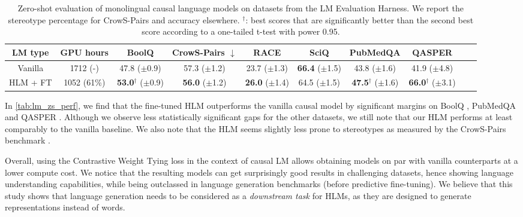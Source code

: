\begin{table}
\centering \scriptsize
\begin{tabular}{cc|cccccccc}
\toprule
LM type       &GPU hours      & BoolQ          & CrowS-Pairs $\downarrow$   & RACE           & SciQ          & PubMedQA &  QASPER    \\ \midrule
Vanilla       &1712 \tiny{(-)} & 47.8 \tiny{($\pm$0.9)}          & 57.3 \tiny{($\pm$1.2)}         & 23.7 \tiny{($\pm$1.3)}           & \textbf{66.4} \tiny{($\pm$1.5)}  & 43.8 \tiny{($\pm$1.6)} &  41.9 \tiny{($\pm$4.8)}        \\ 
HLM \tiny{+ FT} & 1052 \tiny{(61\%)}         & \textbf{53.0}$^\dagger$ \tiny{($\pm$0.9)}           & \textbf{56.0} \tiny{($\pm$1.2)}         & \textbf{26.0} \tiny{($\pm$1.4)}  & 64.5 \tiny{($\pm$1.5)}          & \textbf{47.5}$^\dagger$ \tiny{($\pm$1.6)}  & \textbf{66.0}$^\dagger$ \tiny{($\pm$3.1)}      \\ \bottomrule
\end{tabular}
\caption{Zero-shot evaluation of monolingual causal language models on datasets from the LM Evaluation Harness. We report the stereotype percentage for CrowS-Pairs and accuracy elsewhere. $^\dagger$: best scores that are significantly better than the second best score according to a one-tailed t-test with power 0.95.}
\label{tab:lm_zs_perf}
\end{table}

In \autoref{tab:lm_zs_perf}, we find that the fine-tuned HLM outperforms the vanilla causal model by significant margins on BoolQ \citep{clark-etal-2019-boolq}, PubMedQA \citep{jin-etal-2019-pubmedqa} and QASPER \citep{dasigi-etal-2021-dataset}. Although we observe less statistically significant gaps for the other datasets, we still note that our HLM performs at least comparably to the vanilla baseline.
%
We also note that the HLM seems slightly less prone to stereotypes as measured by the CrowS-Pairs benchmark \citep{nangia-etal-2020-crows}.

Overall, using the Contrastive Weight Tying loss in the context of causal LM allows obtaining models on par with vanilla counterparts at a lower compute cost. We notice that the resulting models can get surprisingly good results in challenging datasets, hence showing language understanding capabilities, while being outclassed in language generation benchmarks (before predictive fine-tuning). We believe that this study shows that language generation needs to be considered as a \textit{downstream task} for HLMs, as they are designed to generate representations instead of words.

